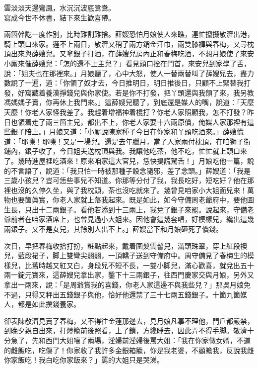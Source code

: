 \begin{myquote}
雲淡淡天邊鸞鳳，水沉沉波底鴛鴦。\\寫成今世不休書，結下來生歡喜帶。
\end{myquote}

兩箇幹訖一度作別，比時難割難捨。{}薛嫂恐怕月娘使人來瞧，連忙攛掇敬濟出港，騎上頭口來家。遲不上兩日，敬濟又稍了兩方銷金汗巾，兩雙膝褲與春梅，又尋枕頂出來與薛嫂兒。又拿銀子打酒，在薛嫂兒房內正和春梅吃酒，不想月娘使了來安小厮來催薛嫂兒：「怎的還不上主兒？」看見頭口拴在門首，來安兒到家學了舌，說：「姐夫也在那裡來。」月娘聽了，心中大怒，使人一替兩替叫了薛嫂兒去，盡力數說了一遍，道：「你領了奴才去，今日推明日，明日推後日，只顧不上緊替我打發，好窩藏着養漢掙錢兒與你家使。若是你不打發，把丫頭還與我領了來，我另教馮媽媽子賣，你再休上我門來。」這薛嫂兒聽了，到底還是媒人的嘴，說道：「天麼天麼！你老人家怪我差了。我趕着增福神着棍打？你老人家照顧我，怎不打發？昨日也領着走了兩三箇主兒，都出不上，你老人家要十六兩原價，俺媒人家那裡有這些銀子陪上。」{}月娘又道：「小厮說陳家種子今日在你家和丫頭吃酒來。」薛嫂慌道：「耶嚛！耶嚛！又是一場兒。還是去年臘月，當了人家兩付枕頂，在咱獅子街鋪內，銀子收了，今日姐夫送枕頂與我。我讓他吃茶，他不吃，忙忙就上頭口來了。幾時進屋裡吃酒來！原來咱家這大官兒，恁快搗謊駕舌！」月娘吃他一篇，說的不言語了，說道：「我只怕一時被那種子設念隨邪，差了念頭。」薛嫂道：「我是三歲小孩兒？豈可恁些事兒不知道。你那等分付了我，我長吃好，短吃好？他在那裡也沒的久停久坐，與了我枕頭，茶也沒吃就來了。幾曾見咱家小大姐面兒來！萬物也要箇眞實，你老人家就上落我起來。既是如此，如今守備周老爺府中，要他圖生長，只出十二兩銀子。看他若添到十三兩上，我兌了銀子來罷。說起來，守備老爺前者在咱家酒席上，也曾見過小大姐來。因他會這幾套唱，好模樣兒，纔出這幾兩銀子。又不是女兒，其餘別人出不上。」薛嫂當下和月娘砸死了價錢。

次日，早把春梅收拾打扮，粧點起來，戴着圍髮雲髻兒，滿頭珠翠，穿上紅段襖兒，藍段裙子，脚上雙彎尖翹翹，一頂轎子送到守備府中。周守備見了春梅生的模樣兒，比舊時越又紅又白，身段兒不短不長，一雙小脚兒，滿心歡喜，{}就兌出五十兩一錠元寶來，這薛嫂兒拿出家，鑿下十三兩銀子，往西門慶家交與月娘，另外又拿出一兩來，說：「是周爺賞我的喜錢，你老人家這邊不與我些兒？」那吳月娘免不過，只得又秤出五錢銀子與他，恰好他還禁了三十七兩五錢銀子。十箇九箇媒人，都是如此撰錢養家。

卻表陳敬濟見賣了春梅，又不得往金蓮那邊去，見月娘凡事不理他，門戶都嚴禁，到晚夕親自出來，打燈籠前後照看，上了鎖，方纔睡去，因此弄不得手脚。敬濟十分急了，先和西門大姐嚷了兩場，{}淫婦前淫婦後罵大姐：「我在你家做女婿，不道的雌飯吃，吃傷了！你家收了我許多金銀箱籠，你是我老婆，不顧贍我，反說我雌你家飯吃！我白吃你家飯來？」罵的大姐只是哭涕。

